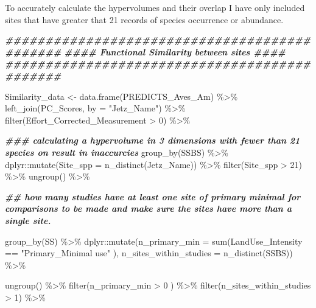 \documentclass[
]{article}
\newenvironment{Shaded}{\begin{snugshade}}{\end{snugshade}}
\newcommand{\AttributeTok}[1]{\textcolor[rgb]{0.77,0.63,0.00}{#1}}
\newcommand{\DecValTok}[1]{\textcolor[rgb]{0.00,0.00,0.81}{#1}}
\newcommand{\DocumentationTok}[1]{\textcolor[rgb]{0.56,0.35,0.01}{\textbf{\textit{#1}}}}
\newcommand{\FunctionTok}[1]{\textcolor[rgb]{0.00,0.00,0.00}{#1}}
\newcommand{\NormalTok}[1]{#1}
\newcommand{\OtherTok}[1]{\textcolor[rgb]{0.56,0.35,0.01}{#1}}
\newcommand{\SpecialCharTok}[1]{\textcolor[rgb]{0.00,0.00,0.00}{#1}}
\newcommand{\StringTok}[1]{\textcolor[rgb]{0.31,0.60,0.02}{#1}}
\begin{document}
To accurately calculate the hypervolumes and their overlap I have only
included sites that have greater that 21 records of species occurrence
or abundance.

\begin{Shaded}
\begin{Highlighting}[]
\DocumentationTok{\#\#\#\#\#\#\#\#\#\#\#\#\#\#\#\#\#\#\#\#\#\#\#\#\#\#\#\#\#\#\#\#\#\#\#\#\#\#\#\#\#\#\#\#\#}
\DocumentationTok{\#\#\#\# Functional Similarity between sites \#\#\#\#}
\DocumentationTok{\#\#\#\#\#\#\#\#\#\#\#\#\#\#\#\#\#\#\#\#\#\#\#\#\#\#\#\#\#\#\#\#\#\#\#\#\#\#\#\#\#\#\#\#\#}


\NormalTok{Similarity\_data }\OtherTok{\textless{}{-}} \FunctionTok{data.frame}\NormalTok{(PREDICTS\_Aves\_Am) }\SpecialCharTok{\%\textgreater{}\%} \FunctionTok{left\_join}\NormalTok{(PC\_Scores, }\AttributeTok{by =} \StringTok{"Jetz\_Name"}\NormalTok{) }\SpecialCharTok{\%\textgreater{}\%} \FunctionTok{filter}\NormalTok{(Effort\_Corrected\_Measurement }\SpecialCharTok{\textgreater{}} \DecValTok{0}\NormalTok{) }\SpecialCharTok{\%\textgreater{}\%}
  
   \DocumentationTok{\#\#\# calculating a hypervolume in 3 dimensions with fewer than 21 species on result in inaccurcies }
  \FunctionTok{group\_by}\NormalTok{(SSBS) }\SpecialCharTok{\%\textgreater{}\%}\NormalTok{ dplyr}\SpecialCharTok{::}\FunctionTok{mutate}\NormalTok{(}\AttributeTok{Site\_spp =} \FunctionTok{n\_distinct}\NormalTok{(Jetz\_Name)) }\SpecialCharTok{\%\textgreater{}\%} \FunctionTok{filter}\NormalTok{(Site\_spp }\SpecialCharTok{\textgreater{}} \DecValTok{21}\NormalTok{) }\SpecialCharTok{\%\textgreater{}\%} \FunctionTok{ungroup}\NormalTok{() }\SpecialCharTok{\%\textgreater{}\%}
  
  \DocumentationTok{\#\# how many studies have at least one site of primary minimal for comparisons to be made and make sure the sites have more than a single site. }
  
  \FunctionTok{group\_by}\NormalTok{(SS) }\SpecialCharTok{\%\textgreater{}\%}\NormalTok{ dplyr}\SpecialCharTok{::}\FunctionTok{mutate}\NormalTok{(}\AttributeTok{n\_primary\_min =} \FunctionTok{sum}\NormalTok{(LandUse\_Intensity }\SpecialCharTok{==} \StringTok{"Primary\_Minimal use"}\NormalTok{ ), }\AttributeTok{n\_sites\_within\_studies =} \FunctionTok{n\_distinct}\NormalTok{(SSBS)) }\SpecialCharTok{\%\textgreater{}\%}
  
  
  \FunctionTok{ungroup}\NormalTok{() }\SpecialCharTok{\%\textgreater{}\%} \FunctionTok{filter}\NormalTok{(n\_primary\_min }\SpecialCharTok{\textgreater{}} \DecValTok{0}\NormalTok{ ) }\SpecialCharTok{\%\textgreater{}\%}  \FunctionTok{filter}\NormalTok{(n\_sites\_within\_studies }\SpecialCharTok{\textgreater{}} \DecValTok{1}\NormalTok{) }\SpecialCharTok{\%\textgreater{}\%}
  

\end{Highlighting}
\end{Shaded}
\end{document}
